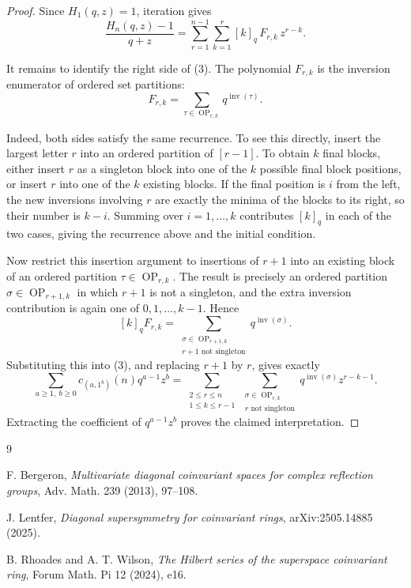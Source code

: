 \documentclass[12pt]{article}
\newcommand{\OP}{\operatorname{OP}}
\newcommand{\inv}{\operatorname{inv}}
\begin{document}
\begin{proof}
Since \(H_1(q,z)=1\), iteration gives
\[
        \frac{H_n(q,z)-1}{q+z}
        =
        \sum_{r=1}^{n-1}\sum_{k=1}^{r}
             [k]_q\,F_{r,k}\,z^{r-k}.                    \tag{3}
\]

It remains to identify the right side of (3).  The polynomial \(F_{r,k}\) is
the inversion enumerator of ordered set partitions:
\[
        F_{r,k}=\sum_{\tau\in \OP_{r,k}}q^{\inv(\tau)}.                \tag{4}
\]

Indeed, both sides satisfy the same recurrence.  To see this directly, insert
the largest letter \(r\) into an ordered partition of \([r-1]\).  To obtain
\(k\) final blocks, either insert \(r\) as a singleton block into one of the
\(k\) possible final block positions, or insert \(r\) into one of the \(k\)
existing blocks.  If the final position is \(i\) from the left, the new
inversions involving \(r\) are exactly the minima of the blocks to its right, so
their number is \(k-i\).  Summing over \(i=1,\ldots,k\) contributes
\([k]_q\) in each of the two cases, giving the recurrence above and the initial
condition.

Now restrict this insertion argument to insertions of \(r+1\) into an existing
block of an ordered partition \(\tau\in\OP_{r,k}\).  The result is precisely an
ordered partition \(\sigma\in\OP_{r+1,k}\) in which \(r+1\) is not a singleton,
and the extra inversion contribution is again one of \(0,1,\ldots,k-1\).
Hence
\[
 [k]_qF_{r,k}
 =
 \sum_{\substack{\sigma\in\OP_{r+1,k}\\ r+1\text{ not singleton}}}
      q^{\inv(\sigma)} .
\]
Substituting this into (3), and replacing \(r+1\) by \(r\), gives exactly
\[
\sum_{a\ge1,\ b\ge0}c_{(a,1^b)}(n)q^{a-1}z^b
=
\sum_{\substack{2\le r\le n\\1\le k\le r-1}}
\sum_{\substack{\sigma\in \OP_{r,k}\\r\text{ not singleton}}}
q^{\inv(\sigma)}z^{r-k-1}.
\]
Extracting the coefficient of \(q^{a-1}z^b\) proves the claimed interpretation.
\end{proof}

\begin{thebibliography}{9}

F. Bergeron,
\emph{Multivariate diagonal coinvariant spaces for complex reflection groups},
Adv. Math. 239 (2013), 97--108.

J. Lentfer,
\emph{Diagonal supersymmetry for coinvariant rings},
arXiv:2505.14885 (2025).

B. Rhoades and A. T. Wilson,
\emph{The Hilbert series of the superspace coinvariant ring},
Forum Math. Pi 12 (2024), e16.

\end{thebibliography}
\end{document}
